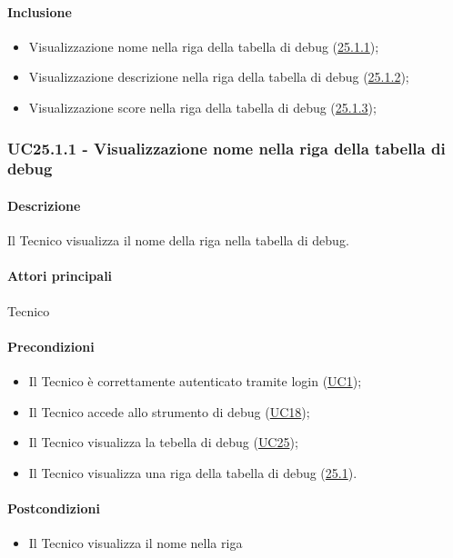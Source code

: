 \paragraph*{Inclusione}
\begin{itemize}
    \item Visualizzazione nome nella riga della tabella di debug (\hyperref[UC25poin1point1]{25.1.1});
    \item Visualizzazione descrizione nella riga della tabella di debug (\hyperref[UC25poin1point2]{25.1.2});
    \item Visualizzazione score nella riga della tabella di debug (\hyperref[UC25poin1point3]{25.1.3});
\end{itemize}


\subsubsection{UC25.1.1 - Visualizzazione nome nella riga della tabella di debug}\label{UC25point1point1}
\paragraph*{Descrizione}
Il Tecnico visualizza il nome della riga nella tabella di debug.

\paragraph*{Attori principali}
Tecnico

\paragraph*{Precondizioni}
\begin{itemize}
  \item Il Tecnico è correttamente autenticato tramite login (\hyperref[UC1]{UC1});
  \item Il Tecnico accede allo strumento di debug (\hyperref[UC18]{UC18});
  \item Il Tecnico visualizza la tebella di debug (\hyperref[UC25]{UC25});
  \item Il Tecnico visualizza una riga della tabella di debug (\hyperref[25point1]{25.1}).
\end{itemize}

\paragraph*{Postcondizioni}
\begin{itemize}
  \item Il Tecnico visualizza il nome nella riga
\end{itemize}

